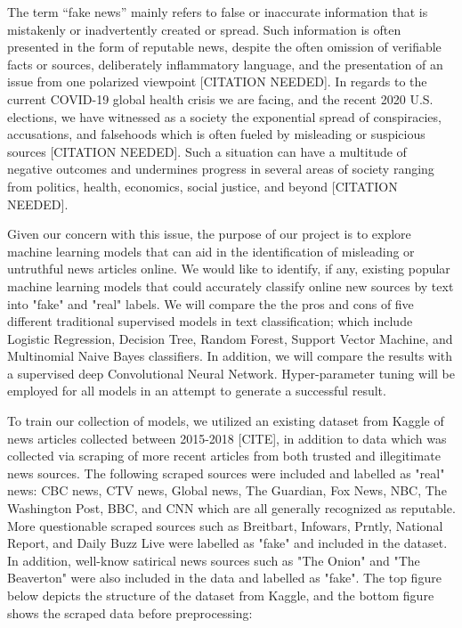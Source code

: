 \documentclass[10pt,twocolumn,letterpaper]{article}
\begin{document}
The term “fake news” mainly refers to false or inaccurate information that is mistakenly or inadvertently created or spread. Such information is often presented in the form of reputable news, despite the often omission of verifiable facts or sources, deliberately inflammatory language, and the presentation of an issue from one polarized viewpoint [CITATION NEEDED]. In regards to the current COVID-19 global health crisis we are facing, and the recent 2020 U.S. elections, we have witnessed as a society the exponential spread of conspiracies, accusations, and falsehoods which is often fueled by misleading or suspicious sources [CITATION NEEDED]. Such a situation can have a multitude of negative outcomes and undermines progress in several areas of society ranging from politics, health, economics, social justice, and beyond [CITATION NEEDED]. 

Given our concern with this issue, the purpose of our project is to explore machine learning models that can aid in the identification of misleading or untruthful news articles online. We would like to identify, if any, existing popular machine learning models that could accurately classify online new sources by text into "fake" and "real" labels. We will compare the the pros and cons of five different traditional supervised models in text classification; which include Logistic Regression, Decision Tree, Random Forest, Support Vector Machine, and Multinomial Naive Bayes classifiers. In addition, we will compare the results with a supervised deep Convolutional Neural Network. Hyper-parameter tuning will be employed for all models in an attempt to generate a successful result.

To train our collection of models, we utilized an existing dataset from Kaggle of news articles collected between 2015-2018 [CITE], in addition to data which was collected via scraping of more recent articles from both trusted and illegitimate news sources. The following scraped sources were included and labelled as "real" news: CBC news, CTV news, Global news, The Guardian, Fox News, NBC, The Washington Post, BBC, and CNN which are all generally recognized as reputable. More questionable scraped sources such as Breitbart, Infowars, Prntly, National Report, and Daily Buzz Live were labelled as "fake" and included in the dataset. In addition, well-know satirical news sources such as "The Onion" and "The Beaverton" were also included in the data and labelled as "fake".  The top figure below depicts the structure of the dataset from Kaggle, and the bottom figure shows the scraped data before preprocessing:
\end{document}
